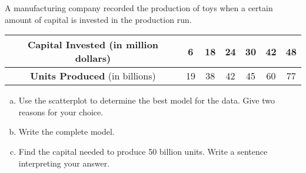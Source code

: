 \documentclass[notes]{subfiles}
\begin{document}
		\begin{ex} A manufacturing company recorded the production of toys when a certain amount of capital is invested in the production run.
			\begin{center}
				{\renewcommand{\arraystretch}{1.2}
				\begin{tabular}{|c||c|c|c|c|c|c|}\hline
					\textbf{Capital Invested} (in  million dollars) & 6 & 18 & 24 & 30 & 42 & 48\\ \hline
					\textbf{Units Produced} (in billions)& 19 & 38 & 42 & 45 & 60 & 77\\ \hline 
				\end{tabular}
				}
			\end{center}
			\begin{enumerate}[(a)]
				\item Use the scatterplot to determine the best model for the data.  Give two reasons for your choice.
				\item Write the complete model.
				\item Find the capital needed to produce 50 billion units.  Write a sentence interpreting your answer.
			\end{enumerate}
		\end{ex}

	\clearpage
\end{document}
